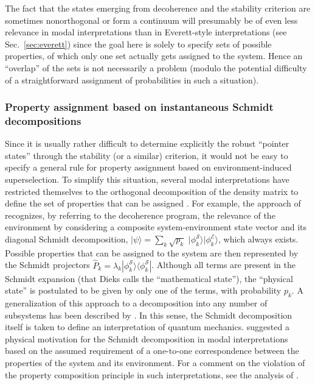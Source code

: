 \documentclass[rmp,aps,amsmath,amsfonts,noshowkeys,noshowpacs,12pt]{revtex4}
\newcommand{\ket}[1]{\ensuremath{|{#1\rangle}}}
\newcommand{\ketbra}[2]{\ensuremath{|{#1 \rangle}{\langle #2}|}}
\begin{document}
The fact that the states emerging from decoherence and the stability
criterion are sometimes nonorthogonal or form a continuum will
presumably be of even less relevance in modal interpretations than in
Everett-style interpretations (see Sec.~\ref{sec:everett}) since the
goal here is solely to specify sets of possible properties, of which
only one set actually gets assigned to the system. Hence an
``overlap'' of the sets is not necessarily a problem (modulo the
potential difficulty of a straightforward assignment of probabilities
in such a situation).


\subsubsection{Property assignment based on instantaneous Schmidt decompositions}

Since it is usually rather difficult to determine explicitly the
robust ``pointer states'' through the stability (or a similar)
criterion, it would not be easy to specify a general rule for property
assignment based on environment-induced superselection.  To simplify
this situation, several modal interpretations have restricted
themselves to the orthogonal decomposition of the density matrix to
define the set of properties that can be assigned \citep[see, for
instance,][]{Kochen:1985:po,Healey:1989:cd,Dieks:1989:rm,Vermaas:1995:gd,Bub:1997:iq}.
For example, the approach of \citet{Dieks:1989:rm} recognizes, by
referring to the decoherence program, the relevance of the environment
by considering a composite system-environment state vector and its
diagonal Schmidt decomposition, $\ket{\psi} = \sum_k \sqrt{p_k} \,\,
\ket{\phi^\mathcal{S}_k} \ket{\phi^\mathcal{E}_k}$, which always
exists. Possible properties that can be assigned to the system are
then represented by the Schmidt projectors $\widehat{P}_k = \lambda_k
\ketbra{\phi^\mathcal{S}_k}{\phi^\mathcal{S}_k}$. Although all terms
are present in the Schmidt expansion (that Dieks calls the
``mathematical state''), the ``physical state'' is postulated to be
given by only one of the terms, with probability $p_k$. A
generalization of this approach to a decomposition into any number of
subsystems has been described by \citet{Vermaas:1995:gd}. In this
sense, the Schmidt decomposition itself is taken to define an
interpretation of quantum mechanics. \citet{Dieks:1995:aa} suggested a
physical motivation for the Schmidt decomposition in modal
interpretations based on the assumed requirement of a one-to-one
correspondence between the properties of the system and its
environment. For a comment on the violation of the property
composition principle in such interpretations, see the analysis of
\citet{Clifton:1996:op}.
\end{document}
